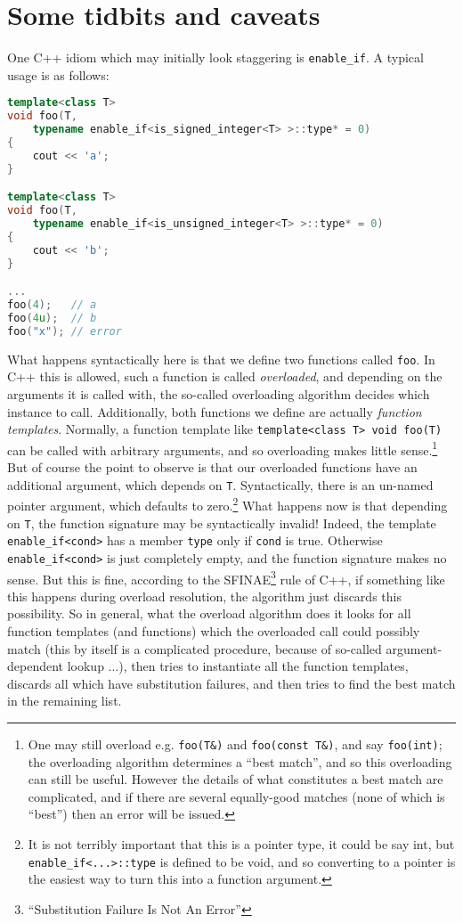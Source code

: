 \documentclass[a4paper,10pt]{book}
\newcommand{\code}{\lstinline}
\begin{document}
{{\section{Some tidbits and caveats}

One C++ idiom which may initially look staggering is \code{enable_if}. A typical
usage is as follows:

\begin{lstlisting}[language=c++]
template<class T>
void foo(T,
    typename enable_if<is_signed_integer<T> >::type* = 0)
{
    cout << 'a';
}

template<class T>
void foo(T,
    typename enable_if<is_unsigned_integer<T> >::type* = 0)
{
    cout << 'b';
}

...
foo(4);   // a
foo(4u);  // b
foo("x"); // error
\end{lstlisting}

What happens syntactically here is that we define two functions called
\code{foo}. In C++ this is allowed, such a function is called \emph{overloaded},
and depending on the arguments it is called with, the so-called overloading
algorithm decides which instance to call. Additionally, both functions we define
are actually \emph{function templates}. Normally, a function template like
\code{template<class T> void foo(T)} can be called with arbitrary
arguments, and so overloading makes little sense.\footnote{One may still overload
e.g. \code{foo(T&)} and \code{foo(const T&)}, and say \code{foo(int)}; the
overloading algorithm determines a ``best match'', and so this overloading can
still be useful. However the details of what constitutes a best match are
complicated, and if there are several equally-good matches (none of which is
``best'') then an error will be issued.} But of course the point to observe is
that our overloaded functions have an additional argument, which depends on
\code{T}. Syntactically, there is an un-named pointer argument, which defaults
to zero.\footnote{It is not terribly important that this is a pointer type, it
could be say int, but \code{enable_if<...>::type} is defined to be void, and so
converting to a pointer is the easiest way to turn this into a function
argument.} What happens now is that depending on \code{T}, the function
signature may be syntactically invalid! Indeed, the template
\code{enable_if<cond>} has a member \code{type} only if \code{cond} is true.
Otherwise \code{enable_if<cond>} is just completely empty, and the function
signature makes no sense. But this is fine, according to the
SFINAE\footnote{``Substitution Failure Is Not An Error''} rule of C++, if
something like this happens during overload resolution, the algorithm just
discards this possibility. So in general, what the overload algorithm does it
looks for all function templates (and functions) which the overloaded call could
possibly match (this by itself is a complicated procedure, because of so-called
argument-dependent lookup ...), then tries to instantiate all the function
templates, discards all which have substitution failures, and then tries to find
the best match in the remaining list.

}}
\end{document}

